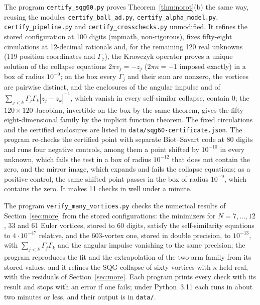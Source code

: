 \documentclass[11pt]{article}
\theoremstyle{definition}
\begin{document}
The program \texttt{certify\_\allowbreak sqg60.py} proves Theorem~\ref{thm:norot}(b) the same way, reusing the modules \texttt{certify\_\allowbreak ball\_\allowbreak ad.py}, \texttt{certify\_\allowbreak alpha\_\allowbreak model.py}, \texttt{certify\_\allowbreak pipeline.py} and \texttt{certify\_\allowbreak crosschecks.py} unmodified. It refines the stored configuration at 100 digits (mpmath, non-rigorous), fixes fifty-eight circulations at 12-decimal rationals and, for the remaining 120 real unknowns (119 position coordinates and $\Gamma_7$), the Krawczyk operator proves a unique solution of the collapse equations $2\pi v_j = -z_j$ ($2\pi\kappa = -1$ imposed exactly) in a box of radius $10^{-9}$; on the box every $\Gamma_j$ and their sum are nonzero, the vortices are pairwise distinct, and the enclosures of the angular impulse and of $\sum_{j<k}\Gamma_j\Gamma_k|z_j - z_k|^{-1}$, which vanish in every self-similar collapse, contain $0$; the $120 \times 120$ Jacobian, invertible on the box by the same theorem, gives the fifty-eight-dimensional family by the implicit function theorem. The fixed circulations and the certified enclosures are listed in \texttt{data/\allowbreak sqg60-\allowbreak certificate.json}. The program re-checks the certified point with separate Biot--Savart code at 80 digits and runs four negative controls, among them a point shifted by $10^{-10}$ in every unknown, which fails the test in a box of radius $10^{-12}$ that does not contain the zero, and the mirror image, which expands and fails the collapse equations; as a positive control, the same shifted point passes in the box of radius $10^{-9}$, which contains the zero. It makes 11 checks in well under a minute.

The program \texttt{verify\_\allowbreak many\_\allowbreak vortices.py} checks the numerical results of Section~\ref{sec:more} from the stored configurations: the minimizers for $N = 7, \dots, 12$, 33 and 61 Euler vortices, stored to 60 digits, satisfy the self-similarity equations to $4 \cdot 10^{-47}$ relative, and the 603-vortex one, stored in double precision, to $10^{-13}$, with $\sum_{j<k}\Gamma_j\Gamma_k$ and the angular impulse vanishing to the same precision; the program reproduces the fit and the extrapolation of the two-arm family from its stored values, and it refines the SQG collapse of sixty vortices with $\kappa$ held real, with the residuals of Section~\ref{sec:more}. Each program prints every check with its result and stops with an error if one fails; under Python~3.11 each runs in about two minutes or less, and their output is in \texttt{data/\allowbreak }.
\end{document}
